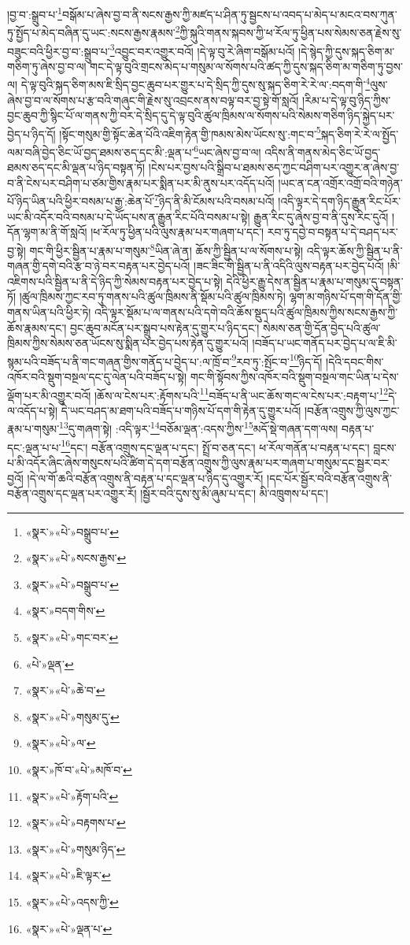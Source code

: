 །བྱ་བ་:སྒྲུབ་པ་\footnote{«སྣར་»«པེ་»བསྒྲུབ་པ་}བསྒོམ་པ་ཞེས་བྱ་བ་ནི་སངས་རྒྱས་ཀྱི་མཛད་པ་ཤིན་ཏུ་སྦྱངས་པ་འབད་པ་མེད་པ་མངའ་བས་ཀུན་ཏུ་སྤྱོད་པ་མེད་བཞིན་དུ་ཡང་:སངས་རྒྱས་རྣམས་\footnote{«སྣར་»«པེ་»སངས་རྒྱས་}ཀྱི་སྐུའི་གནས་སྐབས་ཀྱི་ཕ་རོལ་ཏུ་ཕྱིན་པས་སེམས་ཅན་རྗེས་སུ་བཟུང་བའི་ཕྱིར་བྱ་བ་:སྒྲུབ་པ་\footnote{«སྣར་»«པེ་»བསྒྲུབ་པ་}འབྱུང་བར་འགྱུར་བའོ། །དེ་ལྟ་བུ་རེ་ཞིག་བསྒོམ་པའོ། །དེ་སྙེད་ཀྱི་དུས་སྐད་ཅིག་མ་གཅིག་ཏུ་ཞེས་བྱ་བ་ལ། གང་དེ་ལྟ་བུའི་གྲངས་མེད་པ་གསུམ་ལ་སོགས་པའི་ཚད་ཀྱི་དུས་སྐད་ཅིག་མ་གཅིག་ཏུ་བྱས་ལ། དེ་ལྟ་བུའི་སྐད་ཅིག་མས་ཇི་སྲིད་བྱང་ཆུབ་པར་གྱུར་པ་དེ་སྲིད་ཀྱི་དུས་སུ་སྐད་ཅིག་རེ་རེ་ལ་:བདག་གི་\footnote{«སྣར་»བདག་གིས་}ལུས་ཞེས་བྱ་བ་ལ་སོགས་པ་རྩ་བའི་གཞུང་གི་རྗེས་སུ་འབྲངས་ནས་བལྟ་བར་བྱ་སྟེ་གོ་སླའོ། །རིམ་པ་དེ་ལྟ་བུ་ཉིད་ཀྱིས་བྱང་ཆུབ་ཀྱི་སྙིང་པོ་ལ་གནས་ཀྱི་བར་དེ་སྲིད་དུ་དེ་ལྟ་བུའི་ཚུལ་ཁྲིམས་ལ་སོགས་པའི་སེམས་གཅིག་ཉིད་སྐྱེད་པར་བྱེད་པ་ཉིད་དོ། །སྟོང་གསུམ་གྱི་སྟོང་ཆེན་པོའི་འཇིག་རྟེན་གྱི་ཁམས་མེས་ཡོངས་སུ་:གང་བ་\footnote{«སྣར་»«པེ་»གང་བར་}སྐད་ཅིག་རེ་རེ་ལ་སྤྱོད་ལམ་བཞི་བྱེད་ཅིང་ཡོ་བྱད་ཐམས་ཅད་དང་མི་:ལྡན་པ་\footnote{«པེ་»ལྡན་}ཡང་ཞེས་བྱ་བ་ལ། འདིས་ནི་གནས་མེད་ཅིང་ཡོ་བྱད་ཐམས་ཅད་དང་མི་ལྡན་པ་ཉིད་བསྟན་ཏོ། །ངེས་པར་བྱས་པའི་སྒྲིབ་པ་ཐམས་ཅད་ཀྱང་བཤིག་པར་འགྱུར་ན་ཞེས་བྱ་བ་ནི་ངེས་པར་བཤིག་པ་ཙམ་གྱིས་རྣམ་པར་སྨིན་པར་མི་ནུས་པར་འདོད་པའོ། །ཡང་ན་ངན་འགྲོར་འགྲོ་བའི་གཉེན་པོ་ཉིད་ཡིན་པའི་ཕྱིར་བསམ་པ་རྒྱ་:ཆེན་པོ་\footnote{«སྣར་»«པེ་»ཆེ་བ་}ཉིད་ནི་མི་ངོམས་པའི་བསམ་པའོ། །འདི་ལྟར་དེ་དག་ཉིད་རྒྱུན་རིང་པོར་ཡང་མི་འདོར་བའི་བསམ་པ་དེ་ཡོད་པས་ན་རྒྱུན་རིང་པོའི་བསམ་པ་སྟེ། རྒྱུན་རིང་དུ་ཞེས་བྱ་བ་ནི་དུས་རིང་དུའོ། །དོན་ལྷག་མ་ནི་གོ་སླའོ། །ཕ་རོལ་ཏུ་ཕྱིན་པའི་ལུས་རྣམ་པར་གཞག་པ་དང་། རབ་ཏུ་དབྱེ་བ་བསྟན་པ་དེ་བཤད་པར་བྱ་སྟེ། གང་གི་ཕྱིར་སྦྱིན་པ་རྣམ་པ་གསུམ་\footnote{«སྣར་»«པེ་»གསུམ་དུ་}ཡིན་ཞེ་ན། ཆོས་ཀྱི་སྦྱིན་པ་ལ་སོགས་པ་སྟེ། འདི་ལྟར་ཆོས་ཀྱི་སྦྱིན་པ་ནི་གཞན་གྱི་དགེ་བའི་རྩ་བ་ཉེ་བར་བརྟན་པར་བྱེད་པའོ། །ཟང་ཟིང་གི་སྦྱིན་པ་ནི་འདིའི་ལུས་བརྟན་པར་བྱེད་པའོ། །མི་འཇིགས་པའི་སྦྱིན་པ་ནི་དེ་ཉིད་ཀྱི་སེམས་བརྟན་པར་བྱེད་པ་སྟེ། དེའི་ཕྱིར་རྒྱུ་དེས་ན་སྦྱིན་པ་རྣམ་པ་གསུམ་དུ་བསྟན་ཏོ། །ཚུལ་ཁྲིམས་ཀྱང་རབ་ཏུ་གནས་པའི་ཚུལ་ཁྲིམས་ནི་སྡོམ་པའི་ཚུལ་ཁྲིམས་ཏེ། ལྷག་མ་གཉིས་པོ་དག་གི་དོན་གྱི་གནས་ཡིན་པའི་ཕྱིར་ཏེ། འདི་ལྟར་སྡོམ་པ་ལ་གནས་པའི་དགེ་བའི་ཆོས་སྡུད་པའི་ཚུལ་ཁྲིམས་ཀྱིས་སངས་རྒྱས་ཀྱི་ཆོས་རྣམས་དང་། བྱང་ཆུབ་མངོན་པར་སྒྲུབ་པས་རྟེན་དུ་གྱུར་པ་ཉིད་དང་། སེམས་ཅན་གྱི་དོན་བྱེད་པའི་ཚུལ་ཁྲིམས་ཀྱིས་སེམས་ཅན་ཡོངས་སུ་སྨིན་པར་བྱེད་པས་རྟེན་དུ་གྱུར་པའོ། །བཟོད་པ་ཡང་གནོད་པར་བྱེད་པ་ལ་ཇི་མི་སྙམ་པའི་བཟོད་པ་ནི་གང་གཞན་གྱིས་གནོད་པ་བྱེད་པ་:ལ་ཁྲོ་བ་\footnote{«སྣར་»«པེ་»ལ་}རབ་ཏུ་:སྤོང་བ་\footnote{«སྣར་»ཁོ་བ་«པེ་»མཁོ་བ་}ཉིད་དོ། །དེའི་དབང་གིས་འཁོར་བའི་སྡུག་བསྔལ་དང་དུ་ལེན་པའི་བཟོད་པ་སྟེ། གང་གི་སྟོབས་ཀྱིས་འཁོར་བའི་སྡུག་བསྔལ་གང་ཡིན་པ་དེས་ལྡོག་པར་མི་འགྱུར་བའོ། །ཆོས་ལ་ངེས་པར་:རྟོགས་པའི་\footnote{«སྣར་»«པེ་»རྟོག་པའི་}བཟོད་པ་ནི་ཡང་ཆོས་གང་ལ་ངེས་པར་:བརྟག་པ་\footnote{«སྣར་»«པེ་»བརྟགས་པ་}དེ་ལ་འདོད་པ་སྟེ། དེ་ཡང་བཤད་མ་ཐག་པའི་བཟོད་པ་གཉིས་པོ་དག་གི་རྟེན་དུ་གྱུར་པའོ། །བརྩོན་འགྲུས་ཀྱི་ལུས་ཀྱང་རྣམ་པ་གསུམ་\footnote{«སྣར་»«པེ་»གསུམ་ཉིད་}དུ་གཞག་སྟེ། :འདི་ལྟར་\footnote{«སྣར་»«པེ་»ཇི་ལྟར་}བཅོམ་ལྡན་:འདས་ཀྱིས་\footnote{«སྣར་»«པེ་»འདས་ཀྱི་}མདོ་སྡེ་གཞན་དག་ལས། བརྟན་པ་དང་:ལྡན་པ་པ་\footnote{«སྣར་»«པེ་»ལྡན་པ་}དང་། བརྩོན་འགྲུས་དང་ལྡན་པ་དང་། སྤྲོ་བ་ཅན་དང་། ཕ་རོལ་གནོན་པ་བརྟན་པ་དང་། བླངས་པ་མི་འདོར་ཞིང་ཞེས་གསུངས་པའི་ཚིག་དེ་དག་བརྩོན་འགྲུས་ཀྱི་ལུས་རྣམ་པར་གཞག་པ་གསུམ་དང་སྦྱར་བར་བྱའོ། །དེ་ལ་གོ་ཆའི་བརྩོན་འགྲུས་ནི་བརྟན་པ་དང་ལྡན་པ་ཉིད་དུ་འགྱུར་རོ། །དང་པོར་སྦྱོར་བའི་བརྩོན་འགྲུས་ནི་བརྩོན་འགྲུས་དང་ལྡན་པར་འགྱུར་རོ། །སྦྱོར་བའི་དུས་སུ་མི་ཞུམ་པ་དང་། མི་འཁྲུགས་པ་དང་། 